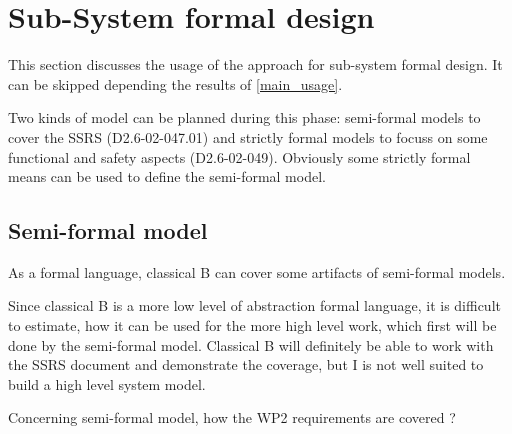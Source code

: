\section{Sub-System formal design}
This section discusses the usage of the approach for sub-system formal design.
It can be skipped depending the results of \ref{main_usage}.

Two kinds of model can be planned during this phase: semi-formal models to  cover the SSRS (D2.6-02-047.01) and strictly formal  models to  focuss on some functional and safety aspects (D2.6-02-049).  Obviously some strictly  formal means can be used to define the semi-formal  model.

\subsection{Semi-formal model}


\begin{author_comment}
As a formal language, classical B  can cover some artifacts of semi-formal models.
\end{author_comment}

\begin{assessor2}
Since classical B is a more low level of abstraction formal language, it is difficult to estimate, how it can be used for the more high level work, which first will be done by the semi-formal model. Classical B will definitely be able to work with the SSRS document and demonstrate the coverage, but I is not well suited to build a high level system model.
\end{assessor2}

Concerning semi-formal model, how the WP2 requirements are covered ?

